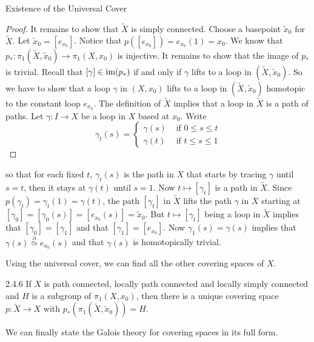 \documentclass[a4paper]{article}
\begin{document}
\begin{thm}{Existence of the Universal Cover}{}
\begin{proof}
It remains to show that $\tilde{X}$ is simply connected. Choose a basepoint $\tilde{x}_0$ for $\tilde{X}$. Let $\tilde{x}_0=[e_{x_0}]$. Notice that $p\left([e_{x_0}]\right)=e_{x_0}(1)=x_0$. We know that $p_\ast:\pi_1(\tilde{X},\tilde{x}_0)\to\pi_1(X,x_0)$ is injective. It remains to show that the image of $p_\ast$ is trivial. Recall that $[\gamma]\in\operatorname{im}(p_\ast)$ if and only if $\gamma$ lifts to a loop in $(\tilde{X},\tilde{x}_0)$. So we have to show that a loop $\gamma$ in $(X,x_0)$ lifts to a loop in $(\tilde{X},\tilde{x}_0)$ homotopic to the constant loop $e_{x_0}$. The definition of $\tilde{X}$ implies that a loop in $\tilde{X}$ is a path of paths. Let $\gamma:I\to X$ be a loop in $X$ based at $x_0$. Write $$\gamma_t(s)=\begin{cases}
\gamma(s) & \text{ if }0\leq s\leq t\\
\gamma(t) & \text{ if }t\leq s\leq 1
\end{cases}$$
\end{proof}
so that for each fixed $t$, $\gamma_t(s)$ is the path in $X$ that starts by tracing $\gamma$ until $s=t$, then it stays at $\gamma(t)$ until $s=1$. Now $t\mapsto[\gamma_t]$ is a path in $\tilde{X}$. Since $p(\gamma_t)=\gamma_t(1)=\gamma(t)$, the path $[\gamma_t]$ in $\tilde{X}$ lifts the path $\gamma$ in $X$ starting at $[\gamma_0]=[\gamma_0(s)]=[e_{x_0}(s)]=\tilde{x}_0$. But $t\mapsto[\gamma_t]$ being a loop  in $\tilde{X}$ implies that $[\gamma_0]=[\gamma_1]$ and that $[\gamma_1]=[e_{x_0}]$. Now $\gamma_1(s)=\gamma(s)$ implies that $\gamma(s)\overset{\partial}{\simeq}e_{x_0}(s)$ and that $\gamma(s)$ is homotopically trivial. 
\end{thm}

Using the universal cover, we can find all the other covering spaces of $X$. 

\begin{thm}{}{2.4.6} If $X$ is path connected, locally path connected and locally simply connected and $H$ is a subgroup of $\pi_1(X,x_0)$, then there is a unique covering space $p:\tilde{X}\to X$ with $p_\ast(\pi_1(\tilde{X},\tilde{x}_0))=H$. 
\end{thm}

We can finally state the Galois theory for covering spaces in its full form. 
\end{document}
